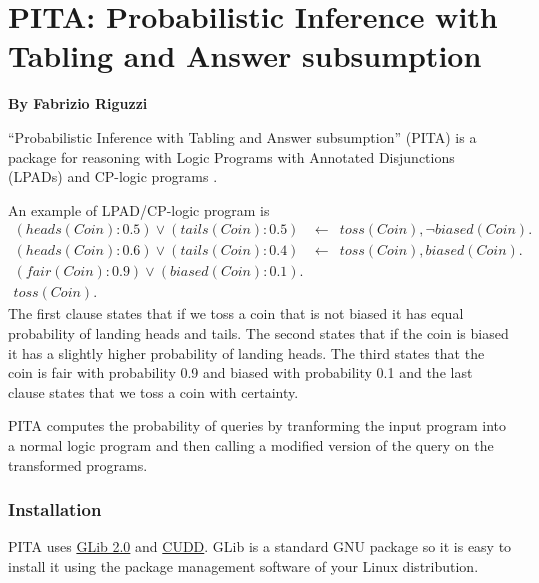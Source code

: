 \chapter{ PITA: Probabilistic  Inference with Tabling and Answer subsumption }
\label{package:pita} 

  \begin{center}
    {\Large {\bf By Fabrizio Riguzzi}}
  \end{center}


%



``Probabilistic  Inference with Tabling and Answer subsumption'' (PITA) \cite{RigSwi10-ICLP10-IC} is a package  for reasoning with Logic Programs with Annotated Disjunctions (LPADs)\cite{VenVer03-TR,VenVer04-ICLP04-IC} and CP-logic programs \cite{VenDenBru-JELIA06,DBLP:journals/tplp/VennekensDB09}.

An example of LPAD/CP-logic program is 
\begin{eqnarray*}
(heads(Coin):0.5)\vee (tails(Coin):0.5)&\leftarrow&
toss(Coin),\neg biased(Coin).\\
(heads(Coin):0.6)\vee (tails(Coin):0.4)&\leftarrow&
toss(Coin), biased(Coin).\\
(fair(Coin):0.9) \vee (biased(Coin):0.1).&&\\
toss(Coin).&&
\end{eqnarray*}
The first clause states that if we toss a coin that is not biased it has equal probability of landing heads and tails. The second states that if the coin is biased it has a slightly higher probability of landing heads. The third states that the coin is fair with probability 0.9 and biased with probability 0.1 and the last clause states that we toss a coin with certainty.

PITA computes the probability of queries by tranforming the input program into a normal logic program and then calling a modified version of the query on the transformed programs.

\subsection{Installation}
PITA uses \href{http://www.gtk.org/}{GLib 2.0} and  \href{http://vlsi.colorado.edu/~fabio/CUDD/}{CUDD}.
GLib is a standard GNU package 
so it is easy to install it using the package management software of your Linux 
distribution.

